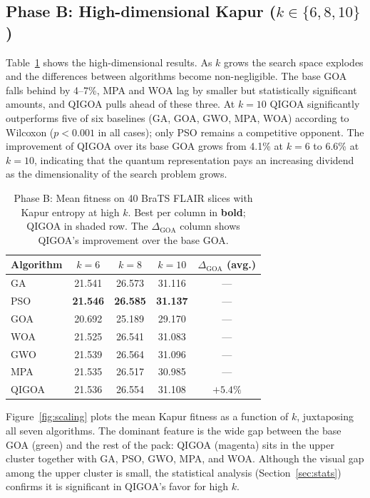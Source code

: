 \subsection{Phase B: High-dimensional Kapur ($k\in\{6,8,10\}$)}

Table~\ref{tab:phaseB} shows the high-dimensional results. As $k$ grows the search space explodes and the differences between algorithms become non-negligible. The base GOA falls behind by 4--7\%, MPA and WOA lag by smaller but statistically significant amounts, and QIGOA pulls ahead of these three. At $k{=}10$ QIGOA significantly outperforms five of six baselines (GA, GOA, GWO, MPA, WOA) according to Wilcoxon ($p{<}0.001$ in all cases); only PSO remains a competitive opponent. The improvement of QIGOA over its base GOA grows from 4.1\% at $k{=}6$ to 6.6\% at $k{=}10$, indicating that the quantum representation pays an increasing dividend as the dimensionality of the search problem grows.

\begin{table}[!t]
\centering\small
\caption{Phase B: Mean fitness on 40 BraTS FLAIR slices with Kapur entropy at high $k$. Best per column in \textbf{bold}; QIGOA in shaded row. The $\Delta_{\text{GOA}}$ column shows QIGOA's improvement over the base GOA.}\label{tab:phaseB}
\begin{tabular}{lccc|c}
\toprule
Algorithm & $k{=}6$ & $k{=}8$ & $k{=}10$ & $\Delta_{\text{GOA}}$ (avg.) \\
\midrule
GA    & 21.541 & 26.573 & 31.116 & --- \\
PSO   & \textbf{21.546} & \textbf{26.585} & \textbf{31.137} & --- \\
GOA   & 20.692 & 25.189 & 29.170 & ---  \\
WOA   & 21.525 & 26.541 & 31.083 & --- \\
GWO   & 21.539 & 26.564 & 31.096 & --- \\
MPA   & 21.535 & 26.517 & 30.985 & --- \\
\rowcolor{gray!15}
QIGOA & 21.536 & 26.554 & 31.108 & $+5.4\%$ \\
\bottomrule
\end{tabular}
\end{table}

Figure~\ref{fig:scaling} plots the mean Kapur fitness as a function of $k$, juxtaposing all seven algorithms. The dominant feature is the wide gap between the base GOA (green) and the rest of the pack: QIGOA (magenta) sits in the upper cluster together with GA, PSO, GWO, MPA, and WOA. Although the visual gap among the upper cluster is small, the statistical analysis (Section~\ref{sec:stats}) confirms it is significant in QIGOA's favor for high $k$.

